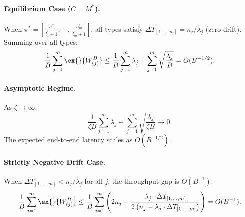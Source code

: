 \paragraph{Equilibrium Case ($C = M^*$).} When $\pi^* = [\frac{n_1^*}{l_1^\prime+1},\,\cdots,\, \frac{n_m^*}{l_m^\prime+1}]$, all types satisfy $\Delta T_{[1,\ldots,m]} = n_j/\lambda_j$ (zero drift). Summing over all types:
$$\frac{1}{B}\sum_{j=1}^m \ex{}{W^B_{(j)}}\leq \frac{1}{B}\sum_{j=1}^m \lambda_j +\sum_{j=1}^m \sqrt{\frac{\lambda_j}{B}} = O(B^{-1/2}).$$

\paragraph{Asymptotic Regime.} As $\zeta \to \infty$:
$$\frac{1}{\zeta B}\sum_{j=1}^m \lambda_j +\sum_{j=1}^m \sqrt{\frac{\lambda_j}{\zeta B}} \to 0.$$
The expected end-to-end latency scales as $O(B^{-1/2})$.

\paragraph{Strictly Negative Drift Case.} When $\Delta T_{[1,\ldots,m]} < n_j/\lambda_j$ for all $j$, the throughput gap is $O(B^{-1})$:
$$\frac{1}{B}\sum_{j=1}^m \ex{}{W^B_{(j)}}\leq \frac{1}{B}  \sum_{j=1}^m \left(2n_j+ \frac{\lambda_j \cdot \Delta T_{[1,\ldots,m]}}{2\left(n_j - \lambda_j\cdot \Delta T_{[1,\ldots,m]}\right)}\right) = O(B^{-1}).$$
